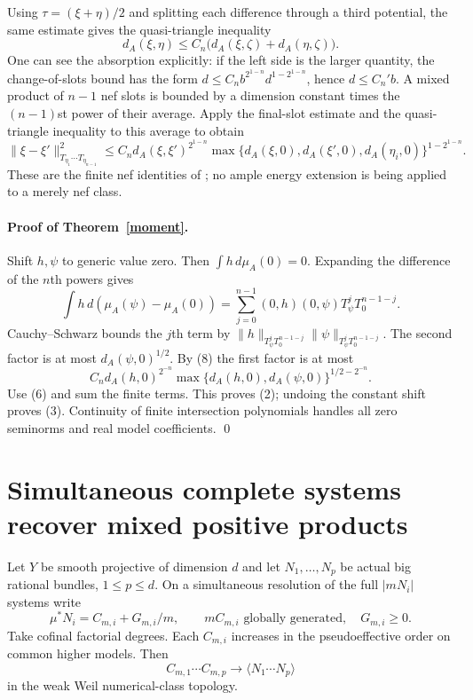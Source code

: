 \documentclass[10pt]{article}
\begin{document}
Using $\tau=(\xi+\eta)/2$ and splitting each difference through a
third potential, the same estimate gives the quasi-triangle inequality
\[
 d_A(\xi,\eta)\le C_n\bigl(d_A(\xi,\zeta)+d_A(\eta,\zeta)\bigr).
\]
One can see the absorption explicitly: if the left side is the larger
quantity, the change-of-slots bound has the form
$d\le C_n b^{2^{1-n}}d^{1-2^{1-n}}$, hence $d\le C_n'b$.
A mixed product of $n-1$ nef slots is bounded by a dimension constant
times the $(n-1)$st power of their average. Apply the final-slot
estimate and the quasi-triangle inequality to this average to obtain
\[
 \|\xi-\xi'\|_{T_{\eta_1}\cdots T_{\eta_{n-1}}}^2
 \le C_n d_A(\xi,\xi')^{2^{1-n}}
       \max\{d_A(\xi,0),d_A(\xi',0),d_A(\eta_i,0)\}^{1-2^{1-n}}.
 \tag{8}
\]
These are the finite nef identities of \cite[Section 3.3]{BJ}; no
ample energy extension is being applied to a merely nef class.

\paragraph{Proof of Theorem~\ref{moment}.}
Shift $h,\psi$ to generic value zero. Then $\int h\,d\mu_A(0)=0$.
Expanding the difference of the $n$th powers gives
\[
 \int h\,d(\mu_A(\psi)-\mu_A(0))
   =\sum_{j=0}^{n-1}(0,h)(0,\psi)T_\psi^jT_0^{n-1-j}. \tag{9}
\]
Cauchy--Schwarz bounds the $j$th term by
$\|h\|_{T_\psi^jT_0^{n-1-j}}\|\psi\|_{T_\psi^jT_0^{n-1-j}}$.
The second factor is at most $d_A(\psi,0)^{1/2}$.
By (8) the first factor is at most
\[
 C_n d_A(h,0)^{2^{-n}}
             \max\{d_A(h,0),d_A(\psi,0)\}^{1/2-2^{-n}}.
\]
Use (6) and sum the finite terms. This proves (2); undoing the constant
shift proves (3). Continuity of finite intersection polynomials handles
all zero seminorms and real model coefficients. \qed

\section{Simultaneous complete systems recover mixed positive products}
Let $Y$ be smooth projective of dimension $d$ and let
$N_1,\ldots,N_p$ be actual big rational bundles, $1\le p\le d$.
On a simultaneous resolution of the full $|mN_i|$ systems write
\[
 \mu^*N_i=C_{m,i}+G_{m,i}/m,
       \qquad mC_{m,i}\text{ globally generated},\quad G_{m,i}\ge0.
\]
Take cofinal factorial degrees. Each $C_{m,i}$ increases in the
pseudoeffective order on common higher models. Then
\[
 C_{m,1}\cdots C_{m,p}
                  \longrightarrow\langle N_1\cdots N_p\rangle
 \tag{10}
\]
in the weak Weil numerical-class topology.
\end{document}
